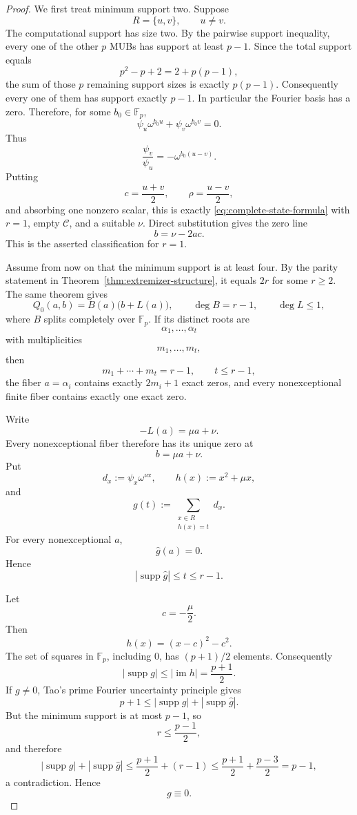 \documentclass[11pt]{article}
\newcommand{\F}{\mathbb F}
\newcommand{\supp}{\operatorname{supp}}
\begin{document}
\begin{proof}
We first treat minimum support two.  Suppose
\[
 R=\{u,v\},
 \qquad u\ne v.
\]
The computational support has size two.  By the pairwise support
inequality, every one of the other \(p\) MUBs has support at least \(p-1\).
Since the total support equals
\[
 p^2-p+2=2+p(p-1),
\]
the sum of those \(p\) remaining support sizes is exactly \(p(p-1)\).
Consequently every one of them has support exactly \(p-1\).  In particular
the Fourier basis has a zero.  Therefore, for some \(b_0\in\F_p\),
\[
 \psi_u\omega^{b_0u}
 +
 \psi_v\omega^{b_0v}
 =0.
\]
Thus
\[
 \frac{\psi_v}{\psi_u}
 =
 -\omega^{b_0(u-v)}.
\]
Putting
\[
 c=\frac{u+v}{2},
 \qquad
 \rho=\frac{u-v}{2},
\]
and absorbing one nonzero scalar, this is exactly
\eqref{eq:complete-state-formula} with \(r=1\), empty
\(\mathcal C\), and a suitable \(\nu\).  Direct substitution gives the
zero line
\[
 b=\nu-2ac.
\]
This is the asserted classification for \(r=1\).

Assume from now on that the minimum support is at least four.  By the
parity statement in Theorem~\ref{thm:extremizer-structure}, it equals
\(2r\) for some \(r\ge2\).  The same theorem gives
\begin{equation}
 Q_0(a,b)=B(a)\bigl(b+L(a)\bigr),
 \qquad
 \deg B=r-1,
 \qquad
 \deg L\le1,
 \label{eq:complete-leading-pencil}
\end{equation}
where \(B\) splits completely over \(\F_p\).  If its distinct roots are
\[
 \alpha_1,\ldots,\alpha_t
\]
with multiplicities
\[
 m_1,\ldots,m_t,
\]
then
\begin{equation}
 m_1+\cdots+m_t=r-1,
 \qquad
 t\le r-1,
 \label{eq:complete-partition}
\end{equation}
the fiber \(a=\alpha_i\) contains exactly \(2m_i+1\) exact zeros, and
every nonexceptional finite fiber contains exactly one exact zero.

Write
\[
 -L(a)=\mu a+\nu.
\]
Every nonexceptional fiber therefore has its unique zero at
\[
 b=\mu a+\nu.
\]
Put
\[
 d_x:=\psi_x\omega^{\nu x},
 \qquad
 h(x):=x^2+\mu x,
\]
and
\[
 g(t):=
 \sum_{\substack{x\in R\\h(x)=t}}d_x.
\]
For every nonexceptional \(a\),
\[
 \widehat g(a)=0.
\]
Hence
\begin{equation}
 |\supp\widehat g|
 \le t
 \le r-1.
 \label{eq:complete-ghat-support}
\end{equation}

Let
\[
 c=-\frac{\mu}{2}.
\]
Then
\[
 h(x)=(x-c)^2-c^2.
\]
The set of squares in \(\F_p\), including \(0\), has
\((p+1)/2\) elements.  Consequently
\begin{equation}
 |\supp g|
 \le|\operatorname{im}h|
 =\frac{p+1}{2}.
 \label{eq:complete-g-support}
\end{equation}
If \(g\ne0\), Tao's prime Fourier uncertainty principle gives
\[
 p+1
 \le
 |\supp g|+|\supp\widehat g|.
\]
But the minimum support is at most \(p-1\), so
\[
 r\le\frac{p-1}{2},
\]
and therefore
\[
 |\supp g|+|\supp\widehat g|
 \le
 \frac{p+1}{2}+(r-1)
 \le
 \frac{p+1}{2}+\frac{p-3}{2}
 =p-1,
\]
a contradiction.  Hence
\begin{equation}
 g\equiv0.
 \label{eq:complete-g-zero}
\end{equation}


\end{proof}
\end{document}
